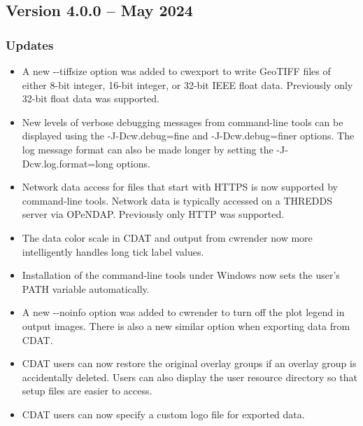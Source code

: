 
\subsection*{Version 4.0.0 -- May 2024}

\subsubsection*{ Updates}

\begin{itemize}

\item A new -{-}tiffsize option was added to cwexport to write GeoTIFF 
files of either 8-bit integer, 16-bit integer, or 32-bit IEEE float data.
Previously only 32-bit float data was supported.

\item New levels of verbose debugging messages from command-line tools can be 
displayed using the -J-Dcw.debug=fine and -J-Dcw.debug=finer options.  The log
message format can also be made longer by setting the -J-Dcw.log.format=long
options.

\item Network data access for files that start with HTTPS is now supported 
by command-line tools.  Network data is typically accessed on a THREDDS server
via OPeNDAP.  Previously only HTTP was supported.

\item The data color scale in CDAT and output from cwrender now more 
intelligently handles long tick label values.

\item Installation of the command-line tools under Windows now sets the 
user's PATH variable automatically.

\item A new -{-}noinfo option was added to cwrender to turn off the plot 
legend in output images.  There is also a new similar option when exporting 
data from CDAT.

\item CDAT users can now restore the original overlay groups if an overlay
group is accidentally deleted.  Users can also display the user resource
directory so that setup files are easier to access.

\item CDAT users can now specify a custom logo file for exported data.


\end{itemize}
